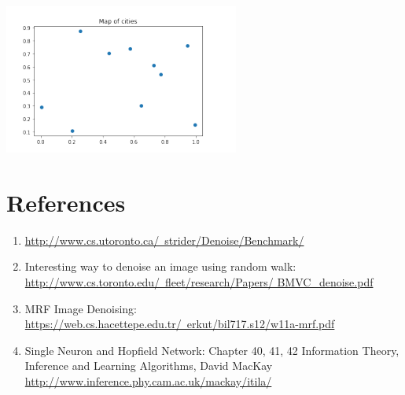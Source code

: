 \documentclass[conference]{IEEEtran}
\begin{document}
\includegraphics{Screenshot 2023-02-25 143726.png}


\section{References}
\begin{enumerate}
    \item  \href{http://www.cs.utoronto.ca/~strider/Denoise/Benchmark/}{http://www.cs.utoronto.ca/~strider/Denoise/Benchmark/}
    \item  Interesting way to denoise an image using random walk: \href{http://www.cs.toronto.edu/~fleet/research/Papers/BMVC_denoise.pdf} {http://www.cs.toronto.edu/~fleet/research/Papers/
    BMVC_denoise.pdf}
    \item MRF Image Denoising: \href{https://web.cs.hacettepe.edu.tr/~erkut/bil717.s12/w11a-mrf.pdf}
{https://web.cs.hacettepe.edu.tr/~erkut/bil717.s12/w11a-mrf.pdf }
    \item Single Neuron and Hopfield Network: Chapter 40, 41, 42 Information Theory, Inference and Learning Algorithms, David MacKay
\href{http://www.inference.phy.cam.ac.uk/mackay/itila/}
{http://www.inference.phy.cam.ac.uk/mackay/itila/}

\end{enumerate}
\end{document}
